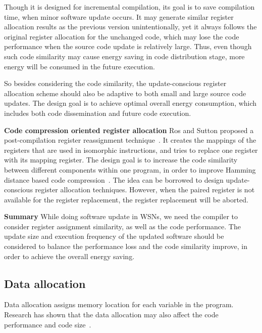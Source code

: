 Though it is designed for incremental compilation, its goal is to save compilation time, when minor software update occurs. It may generate similar register allocation results as the previous version unintentionally, yet it always follows the original register allocation for the unchanged code, which may lose the code performance when the source code update is relatively large. Thus, even though such code similarity may cause energy saving in code distribution stage, more energy will be consumed in the future execution.

So besides considering the code similarity, the update-conscious register allocation scheme should also be adaptive to both small and large source code updates. The design goal is to achieve optimal overall energy consumption, which includes both code dissemination and future code execution. 	

\textbf{Code compression oriented register allocation}
Ros and Sutton proposed a post-compilation register reassignment technique~\cite{related:register-reassignment}. It creates the mappings of the registers that are used in isomorphic instructions, and tries to replace one register with its mapping register. The design goal is to increase the code similarity between different components within one program, in order to improve Hamming distance based code compression~\cite{hamming-compress}. 
The idea can be borrowed to design update-conscious register allocation techniques. However, when the paired register is not available for the register replacement, the register replacement will be aborted. 

\textbf{Summary}
While doing software update in WSNs, we need the compiler to consider register assignment similarity, as well as the code performance. The update size and execution frequency of the updated software should be considered to balance the performance loss and the code similarity improve, in order to achieve the overall energy saving.

\subsection{Data allocation}
Data allocation assigns memory location for each variable in the program. Research has shown that the data allocation may also affect the code performance and code size~\cite{related:liao, related:bartley}.

